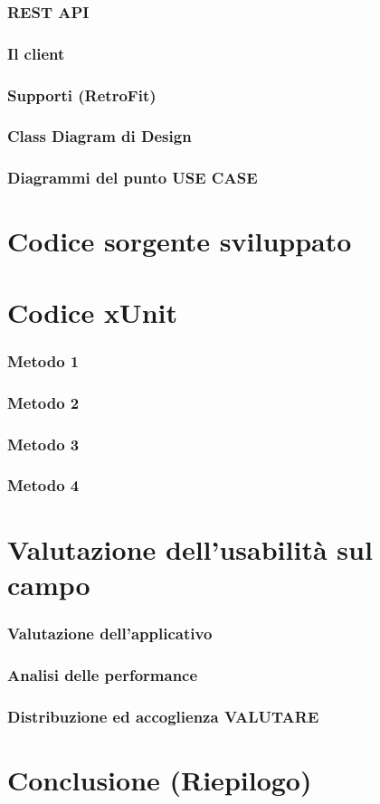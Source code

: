 \documentclass{article}
\begin{document}
		\subsubsection{REST API}
		\subsubsection{Il client}
		\subsubsection{Supporti (RetroFit)}
		\subsubsection{Class Diagram di Design}
			\subsubsection{Diagrammi del punto USE CASE}
	\section{Codice sorgente sviluppato}
	\section{Codice xUnit}
		\subsubsection{Metodo 1}
		\subsubsection{Metodo 2}
		\subsubsection{Metodo 3}
		\subsubsection{Metodo 4}
	\section{Valutazione dell'usabilità sul campo}
		\subsubsection{Valutazione dell'applicativo}
		\subsubsection{Analisi delle performance}
		\subsubsection{Distribuzione ed accoglienza VALUTARE}
	\section{Conclusione (Riepilogo)}
		
\end{document}
